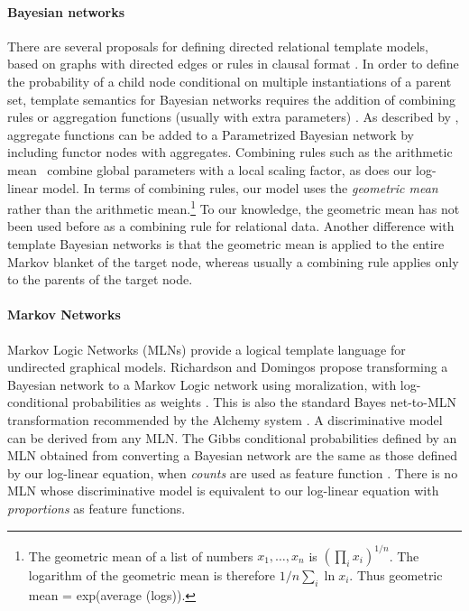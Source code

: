 \documentclass[twoside,11pt]{article}
\begin{document}
\paragraph{Bayesian networks} There are several proposals for defining directed relational template models, based on graphs with directed edges or rules in clausal format \cite{Kersting2007,Getoor2007c,Fierens2009,Milch2007}. In order to define the probability of a child node conditional on multiple instantiations of a parent set, template semantics for Bayesian networks requires the addition of combining rules \cite{Kersting2007} or aggregation functions (usually with extra parameters) \cite{Getoor2007c}. As described by \cite{Kersting2007}, aggregate functions can be added to a Parametrized Bayesian network by including functor nodes with aggregates. Combining rules such as the arithmetic mean~\cite{Natarajan2010} combine global parameters with a local scaling factor, as does our log-linear model. In terms of combining rules,  our model uses the {\em geometric mean} rather than the arithmetic mean.\footnote{The geometric mean of a list of numbers $x_{1},\ldots,x_{n}$ is $(\prod_{i} x_{i})^{1/n}$. The logarithm of the geometric mean is therefore $1/n \sum_{i} \ln x_{i}$. Thus geometric mean = exp(average (logs)).} To our knowledge, the geometric mean has not been used before as a combining rule for relational data.  Another difference with template Bayesian networks is that the geometric mean is applied to the entire Markov blanket of the target node, whereas usually a combining rule applies only to the parents of the target node. 

\paragraph{Markov Networks} Markov Logic Networks (MLNs) provide a logical template language for undirected graphical models. 
Richardson and Domingos propose transforming a Bayesian network to a Markov Logic network using moralization, with log-conditional probabilities as weights \cite{Domingos2007}. 
This is also the standard Bayes net-to-MLN transformation recommended by the Alchemy system \cite{bib:bayes-convert}. A discriminative model can be derived from any MLN.  The Gibbs conditional probabilities defined by an MLN obtained from converting a Bayesian network are the same as those defined by our log-linear equation, when {\em counts} are used as feature function \cite{Schulte2011}. There is no MLN whose discriminative model is equivalent to our log-linear equation with {\em proportions} as feature functions.  
 
\end{document}
